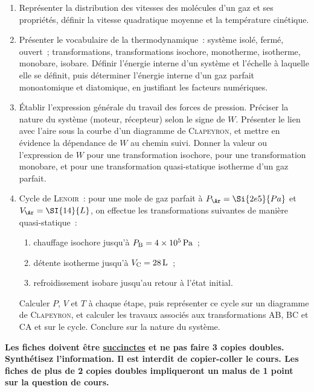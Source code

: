 \documentclass[a4paper, 10pt, final, garamond]{book}
\begin{document}
\begin{enumerate}[label=\sqenumi]
    \item Représenter la distribution des vitesses des molécules d'un gaz et ses
      propriétés, définir la vitesse quadratique moyenne et la température
      cinétique.

    \item Présenter le vocabulaire de la thermodynamique~: système isolé, fermé,
      ouvert~; transformations, transformations isochore, monotherme, isotherme,
      monobare, isobare. Définir l'énergie interne d'un système et l'échelle à
      laquelle elle se définit, puis déterminer l'énergie interne d'un gaz
      parfait monoatomique et diatomique, en justifiant les facteurs numériques.

    \item Établir l'expression générale du travail des forces de pression.
    Préciser la nature du système (moteur, récepteur) selon le signe de $W$.
    Présenter le lien avec l'aire sous la courbe d'un diagramme de
    \textsc{Clapeyron}, et mettre en évidence la dépendance de $W$ au chemin
    suivi. Donner la valeur ou l'expression de $W$ pour une transformation
    isochore, pour une transformation monobare, et pour une transformation
    quasi-statique isotherme d'un gaz parfait.

    \item Cycle de \textsc{Lenoir}~: pour une mole de gaz parfait à $P_\Ar =
      \Si{2e5}{Pa}$ et $V_\Ar = \SI{14}{L}$, on effectue les transformations
      suivantes de manière quasi-statique~:
      \begin{enumerate}[label=\alph*)]
        \item chauffage isochore jusqu'à $P_{\rm B} = \SI{4e5}{Pa}$~;
        \item détente isotherme jusqu'à $V_{\rm C} = \SI{28}{L}$~;
        \item refroidissement isobare jusqu'au retour à l'état initial.
      \end{enumerate}
      Calculer $P$, $V$ et $T$ à chaque étape, puis représenter ce cycle sur un
      diagramme de \textsc{Clapeyron}, et calculer les travaux associés aux
      transformations AB, BC et CA et sur le cycle. Conclure sur la nature du
      système.
\end{enumerate}
\vspace{-5pt}

\begin{framed}
    \centering\bfseries\large
    Les fiches doivent être \ul{succinctes} et ne pas faire 3 copies doubles.
    Synthétisez l'information. Il est interdit de copier-coller le cours.
    \bigbreak \Huge
    Les fiches de plus de 2 copies doubles impliqueront un malus de 1 point sur
    la question de cours.
\end{framed}
\end{document}
